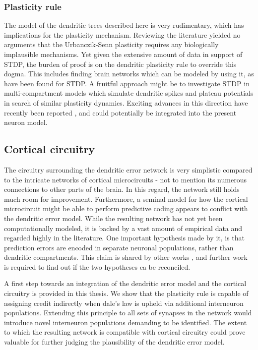 \subsubsection*{Plasticity rule}

The model of the dendritic trees described here is very rudimentary, which has implications for the plasticity
mechanism. Reviewing the literature yielded no arguments that the Urbanczik-Senn plasticity requires any biologically
implausible mechanisms. Yet given the extensive amount of data in support of STDP, the burden of proof is on the
dendritic plasticity rule to override this dogma. This includes finding brain networks which can be modeled by using it,
as have been found for STDP. A fruitful approach might be to investigate STDP in multi-compartment models which simulate
dendritic spikes and plateau potentials in search of similar plasticity dynamics. Exciting advances in this direction
have recently been reported \citep{Bono2017,Schiess2016,magee2020synaptic}, and could potentially be integrated into
the present neuron model.


\subsection*{Cortical circuitry}

The circuitry surrounding the dendritic error network is very simplistic compared to the intricate networks of cortical
microcircuits - not to mention its numerous connections to other parts of the brain. In this regard, the network still
holds much room for improvement. Furthermore, a seminal model for how the cortical microcircuit might be able to perform
predictive coding \citep{bastos2012canonical} appears to conflict with the dendritic error model. While the resulting
network has not yet been computationally modeled, it is backed by a vast amount of empirical data and regarded highly in
the literature. One important hypothesis made by it, is that prediction errors are encoded in separate neuronal
populations, rather than dendritic compartments. This claim is shared by other works
\citep{Hertaeg2022,Whittington2017}, and further work is required to find out if the two hypotheses ca be reconciled.

A first step towards an integration of the dendritic error model and the cortical circuitry is provided in this thesis.
We show that the plasticity rule is capable of assigning credit indirectly when dale's law is upheld via
additional interneuron populations. Extending this principle to all sets of synapses in the network would introduce
novel interneuron populations demanding to be identified. The extent to which the resulting network is compatible with
cortical circuitry could prove valuable for further judging the plausibility of the dendritic error model.

